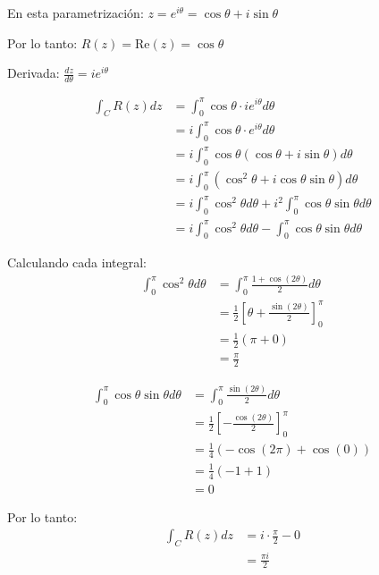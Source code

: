\documentclass{article}
\begin{document}
En esta parametrización: $z = e^{i\theta} = \cos\theta + i\sin\theta$

Por lo tanto: $R(z) = \text{Re}(z) = \cos\theta$

Derivada: $\frac{dz}{d\theta} = ie^{i\theta}$

\begin{align*}
\int_C R(z) dz &= \int_0^{\pi} \cos\theta \cdot ie^{i\theta} d\theta \\
               &= i \int_0^{\pi} \cos\theta \cdot e^{i\theta} d\theta \\
               &= i \int_0^{\pi} \cos\theta (\cos\theta + i\sin\theta) d\theta \\
               &= i \int_0^{\pi} (\cos^2\theta + i\cos\theta\sin\theta) d\theta \\
               &= i \int_0^{\pi} \cos^2\theta d\theta + i^2 \int_0^{\pi} \cos\theta\sin\theta d\theta \\
               &= i \int_0^{\pi} \cos^2\theta d\theta - \int_0^{\pi} \cos\theta\sin\theta d\theta
\end{align*}

Calculando cada integral:
\begin{align*}
\int_0^{\pi} \cos^2\theta d\theta &= \int_0^{\pi} \frac{1 + \cos(2\theta)}{2} d\theta \\
                                    &= \frac{1}{2}\left[\theta + \frac{\sin(2\theta)}{2}\right]_0^{\pi} \\
                                    &= \frac{1}{2}(\pi + 0) \\
                                    &= \frac{\pi}{2}
\end{align*}

\begin{align*}
\int_0^{\pi} \cos\theta\sin\theta d\theta &= \int_0^{\pi} \frac{\sin(2\theta)}{2} d\theta \\
                                           &= \frac{1}{2}\left[-\frac{\cos(2\theta)}{2}\right]_0^{\pi} \\
                                           &= \frac{1}{4}(-\cos(2\pi) + \cos(0)) \\
                                           &= \frac{1}{4}(-1 + 1) \\
                                           &= 0
\end{align*}

Por lo tanto:
\begin{align*}
\int_C R(z) dz &= i \cdot \frac{\pi}{2} - 0 \\
               &= \frac{\pi i}{2}
\end{align*}
\end{document}
